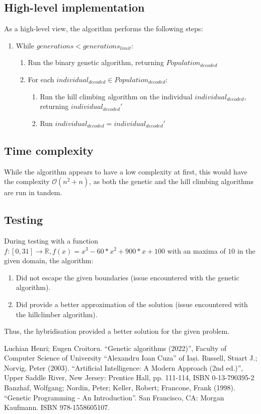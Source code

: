 \documentclass[conference]{IEEEtran}
\begin{document}
\subsection{High-level implementation}
As a high-level view, the algorithm performs the following steps:
\begin{enumerate}
    \item While $generations < generations_{limit}$:
    \begin{enumerate}
        \item Run the binary genetic algorithm, returning $Population_{decoded}$
        \item For each $individual_{decoded} \in Population_{decoded}$:
        \begin{enumerate}
            \item Run the hill climbing algorithm on the individual $individual_{decoded}$, returning $individual_{decoded}'$
            \item Run $individual_{decoded} = individual_{decoded}'$
        \end{enumerate}
    \end{enumerate}
\end{enumerate}

\subsection{Time complexity}
While the algorithm appears to have a low complexity at first, this would have the complexity $\mathcal{O}(n^2 + n)$, as both
the genetic and the hill climbing algorithms are run in tandem.

\subsection{Testing}
During testing with a function $f : [0, 31] \rightarrow \mathbb{R}, f(x) = x^3 - 60*x^2 + 900*x + 100$ with an maxima of $10$ in the given domain, the algorithm:
\begin{enumerate}
    \item Did not escape the given boundaries (issue encountered with the genetic algorithm).
    \item Did provide a better approximation of the solution (issue encountered with the hillclimber algorithm).
\end{enumerate}

Thus, the hybridisation provided a better solution for the given problem.


\begin{thebibliography}{00}
 Luchian Henri; Eugen Croitoru. ``Genetic algorithms (2022)'', Faculty of Computer Science of University ``Alexandru Ioan Cuza'' of Iași.
 Russell, Stuart J.; Norvig, Peter (2003). ``Artificial Intelligence: A Modern Approach (2nd ed.)'', Upper Saddle River, New Jersey: Prentice Hall, pp. 111-114, ISBN 0-13-790395-2 
 Banzhaf, Wolfgang; Nordin, Peter; Keller, Robert; Francone, Frank (1998). ``Genetic Programming - An Introduction''. San Francisco, CA: Morgan Kaufmann. ISBN 978-1558605107.
\end{thebibliography}
\end{document}
